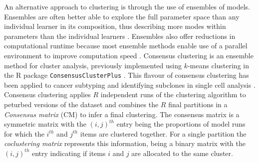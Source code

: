 \documentclass{bioinfo}
\begin{document}
An alternative approach to clustering is through the use of ensembles of models. Ensembles are often better able to explore the full parameter space than any individual learner in its composition, thus describing more modes within parameters than the individual learners \citep{ghaemi2011review}. Ensembles also offer reductions in computational runtime because most ensemble methods enable use of a parallel environment to improve computation speed \citep{ghaemi2009survey}. Consensus clustering \citep{monti2003consensus} is an ensemble method for cluster analysis, previously implemented using $k$-means clustering in the R package \texttt{ConsensusClusterPlus} \citep{wilkerson2010consensusclusterplus}. This flavour of consensus clustering has been applied to cancer subtyping \citep{lehmann2011identification, verhaak2010integrated} and identifying subclones in single cell analysis \citep{kiselev2017sc3}. Consensus clustering applies $R$ independent runs of the clustering algorithm to peturbed versions of the dataset and combines the $R$ final partitions in a \emph{Consensus matrix} (CM) to infer a final clustering. The consensus matrix is a symmetric matrix with the $(i, j)^{th}$ entry being the proportions of model runs for which the $i^{th}$ and $j^{th}$ items are clustered together. For a single partition the \emph{coclustering matrix} represents this information, being a binary matrix with the $(i, j)^{th}$ entry indicating if items $i$ and $j$ are allocated to the same cluster.


\end{document}
